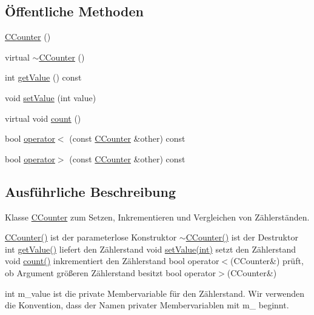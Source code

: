 \subsection*{Öffentliche Methoden}
\begin{DoxyCompactItemize}
\item 
\hyperlink{class_c_counter_ab83c6f9600beb5686747493da731a04c}{C\+Counter} ()
\item 
virtual \hyperlink{class_c_counter_a1af3cc000781fcd67b9e4fe1b25fbc9c}{$\sim$\+C\+Counter} ()
\item 
int \hyperlink{class_c_counter_ad91db4cd517159f7cbb7d3976eede482}{get\+Value} () const
\item 
void \hyperlink{class_c_counter_ac41245afdd95c0149e99bad21696a372}{set\+Value} (int value)
\item 
virtual void \hyperlink{class_c_counter_a90f3e164f3fc1dcf91044702d6940c4d}{count} ()
\item 
bool \hyperlink{class_c_counter_ac43e4c4cb447d22636ac208d426d95eb}{operator$<$} (const \hyperlink{class_c_counter}{C\+Counter} \&other) const
\item 
bool \hyperlink{class_c_counter_a23decf75e74ddfd25feb11ae6aad9c8a}{operator$>$} (const \hyperlink{class_c_counter}{C\+Counter} \&other) const
\end{DoxyCompactItemize}


\subsection{Ausführliche Beschreibung}
Klasse \hyperlink{class_c_counter}{C\+Counter} zum Setzen, Inkrementieren und Vergleichen von Zählerständen. 

\hyperlink{class_c_counter_ab83c6f9600beb5686747493da731a04c}{C\+Counter()} ist der parameterlose Konstruktor \hyperlink{class_c_counter_a1af3cc000781fcd67b9e4fe1b25fbc9c}{$\sim$\+C\+Counter()} ist der Destruktor int \hyperlink{class_c_counter_ad91db4cd517159f7cbb7d3976eede482}{get\+Value()} liefert den Zählerstand void \hyperlink{class_c_counter_ac41245afdd95c0149e99bad21696a372}{set\+Value(int)} setzt den Zählerstand void \hyperlink{class_c_counter_a90f3e164f3fc1dcf91044702d6940c4d}{count()} inkrementiert den Zählerstand bool operator$<$(\+C\+Counter\&) prüft, ob Argument größeren Zählerstand besitzt bool operator$>$(\+C\+Counter\&)

int m\+\_\+value ist die private Membervariable für den Zählerstand. Wir verwenden die Konvention, dass der Namen privater Membervariablen mit m\+\_\+ beginnt. 

